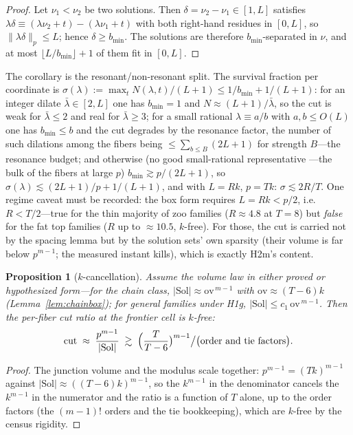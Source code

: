 \documentclass[11pt,a4paper]{article}
\numberwithin{equation}{section}
\theoremstyle{plain}
\newtheorem{proposition}[theorem]{Proposition}
\theoremstyle{definition}
\theoremstyle{remark}
\begin{document}
\begin{proof}
Let $\nu_1<\nu_2$ be two solutions. Then
$\delta=\nu_2-\nu_1\in[1,L]$ satisfies
$\lambda\delta\equiv(\lambda\nu_2+t)-(\lambda\nu_1+t)$ with both
right-hand residues in $[0,L]$, so $\|\lambda\delta\|_p\le L$; hence
$\delta\ge b_{\min}$. The solutions are therefore $b_{\min}$-separated
in $\nu$, and at most $\lfloor L/b_{\min}\rfloor+1$ of them fit in
$[0,L]$.
\end{proof}

The corollary is the resonant/non-resonant split. The survival fraction
per coordinate is
$\sigma(\lambda):=\max_t N(\lambda,t)/(L+1)\le 1/b_{\min}+1/(L+1)$:
for an integer dilate $\bar\lambda\in[2,L]$ one has $b_{\min}=1$ and
$N\approx(L+1)/\bar\lambda$, so the cut is weak for $\bar\lambda\le 2$
and real for $\bar\lambda\ge 3$; for a small rational
$\lambda\equiv a/b$ with $a,b\le O(L)$ one has $b_{\min}\le b$ and the
cut degrades by the resonance factor, the number of such dilations among
the fibers being $\le\sum_{b\le B}(2L+1)$ for strength $B$---the
resonance budget; and otherwise (no good small-rational representative
---the bulk of the fibers at large $p$) $b_{\min}\gtrsim p/(2L+1)$, so
$\sigma(\lambda)\lesssim(2L+1)/p+1/(L+1)$, and with $L=Rk$, $p=Tk$:
$\sigma\lesssim 2R/T$. One regime caveat must be recorded: the box form
requires $L=Rk<p/2$, i.e.\ $R<T/2$---true for the thin majority of zoo
families ($R\approx4.8$ at $T=8$) but \emph{false} for the fat top
families ($R$ up to $\approx10.5$, $k$-free). For those, the cut is
carried not by the spacing lemma but by the solution sets' own sparsity
(their volume is far below $p^{m-1}$; the measured instant kills),
which is exactly H2m's content.

\begin{proposition}[$k$-cancellation]\label{prop:kcanc}
Assume the volume law in either proved or hypothesized form---for the
chain class, $|\mathrm{Sol}|\approx\mathrm{ov}^{\,m-1}$ with
$\mathrm{ov}\approx(T-6)k$ (Lemma~\ref{lem:chainbox}); for general
families under H1g, $|\mathrm{Sol}|\le c_1\,\mathrm{ov}^{\,m-1}$. Then
the per-fiber cut ratio at the frontier cell is $k$-free:
\[
\mathrm{cut}\;\approx\;\frac{p^{m-1}}{|\mathrm{Sol}|}
\;\gtrsim\;\Bigl(\frac{T}{T-6}\bigr)^{m-1}\big/\bigl(\text{order and
tie factors}\bigr).
\]
\end{proposition}

\begin{proof}
The junction volume and the modulus scale together:
$p^{m-1}=(Tk)^{m-1}$ against $|\mathrm{Sol}|\approx((T-6)k)^{m-1}$,
so the $k^{m-1}$ in the denominator cancels the $k^{m-1}$ in the
numerator and the ratio is a function of $T$ alone, up to the order
factors (the $(m-1)!$ orders and the tie bookkeeping), which are
$k$-free by the census rigidity.
\end{proof}
\end{document}

